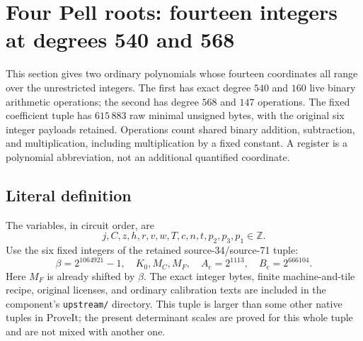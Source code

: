 \section{Four Pell roots: fourteen integers at degrees 540 and 568}
\label{sec:crt14}

This section gives two ordinary polynomials whose fourteen coordinates all
range over the unrestricted integers. The first has exact degree $540$ and
$160$ live binary arithmetic operations; the second has degree $568$ and
$147$ operations. The fixed coefficient tuple has $615\,883$ raw minimal
unsigned bytes, with the original six integer payloads retained. Operations
count shared binary addition, subtraction, and multiplication, including
multiplication by a fixed constant. A register is a polynomial abbreviation,
not an additional quantified coordinate.

\subsection{Literal definition}

The variables, in circuit order, are
\[
 j,C,z,h,r,v,w,T,c,n,t,p_2,p_3,p_1\in\mathbb Z.
\]
Use the six fixed integers of the retained source-34/source-71 tuple:
\[
 \beta=2^{1064921}-1,\quad K_0,M_C,M_F,\quad
 A_{\mathrm c}=2^{1113},\quad B_{\mathrm c}=2^{666104}.
\]
Here $M_F$ is already shifted by $\beta$. The exact integer bytes, finite
machine-and-tile recipe, original licenses, and ordinary calibration texts
are included in the component's \texttt{upstream/} directory. This tuple is
larger than some other native tuples in ProveIt; the present determinant
scales are proved for this whole tuple and are not mixed with another one.

